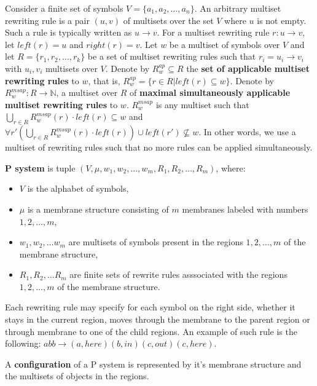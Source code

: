 \documentclass[a4paper,10pt]{article}
\begin{document}

Consider a finite set of symbols $V=\{a_1, a_2,\dots, a_n\}$. An arbitrary multiset rewriting rule is a pair $(u, v)$ of multisets over the set $V$ where $u$ is not empty. Such a rule is typically written as $u\rightarrow v$. For a multiset rewriting rule $r : u\rightarrow v$, let $left(r) = u$ and $right(r) = v$. Let $w$ be a multiset of symbols over $V$ and let $R=\{r_1, r_2,\dots, r_k\}$ be a set of multiset rewriting rules such that $r_i = u_i\rightarrow v_i$ with $u_i, v_i$ multisets over $V$. Denote by $R^{ap}_w\subseteq R$ the {\bf set of applicable multiset rewriting rules} to $w$, that is, $R^{ap}_w = \{r\in R|left(r)\subseteq w\}$. Denote by $R^{msap}_w: R\rightarrow \mathbb N$, a multiset over $R$ of {\bf maximal simultaneously applicable multiset rewriting rules} to $w$. $R^{msap}_w$ is any multiset such that $\displaystyle\bigcup_{r\in R} R^{msap}_w(r)\cdot left(r)\subseteq w$ and $\forall r' \left(\displaystyle\bigcup_{r\in R} R^{msap}_w(r)\cdot left(r)\right)\cup left(r')\nsubseteq w$. In other words, we use a multiset of rewriting rules such that no more rules can be applied simultaneously.


{\bf P system} is tuple $(V, \mu, w_1, w_2,\dots , w_m, R_1, R_2, \dots , R_m)$, where:
\begin{itemize}
  \item $V$ is the alphabet of symbols,
  \item $\mu$ is a membrane structure consisting of $m$ membranes labeled with numbers $1,2,\dots,m$,
  \item $w_1,w_2,\dots w_m$ are multisets of symbols present in the regions $1,2,\dots,m$ of the membrane structure,
  \item $R_1,R_2,\dots R_m$ are finite sets of rewrite rules asssociated with the regions $1,2,\dots,m$ of the membrane structure.
\end{itemize}
  
Each rewriting rule may specify for each symbol on the right side, whether it stays in the current region, moves through the membrane to the parent region or through membrane to one of the child regions. An example of such rule is the following: $abb\rightarrow (a,here)(b,in)(c,out)(c,here)$.


A {\bf configuration} of a P system is represented by it's membrane structure and the multisets of objects in the regions.
\end{document}
